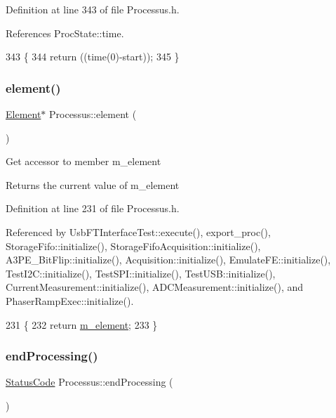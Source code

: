Definition at line 343 of file Processus.\+h.



References Proc\+State\+::time.


\begin{DoxyCode}
343                                    \{
344     \textcolor{keywordflow}{return} ((time(0)-start));
345   \}
\end{DoxyCode}
\mbox{\label{classProcessus_a6fe155527431a7190b7d44d600b9608d}} 
\subsubsection{\texorpdfstring{element()}{element()}}
{\footnotesize\ttfamily \hyperlink{classElement}{Element}$\ast$ Processus\+::element (\begin{DoxyParamCaption}{ }\end{DoxyParamCaption})\hspace{0.3cm}{\ttfamily [inline]}}

Get accessor to member m\+\_\+element \begin{DoxyReturn}{Returns}
the current value of m\+\_\+element 
\end{DoxyReturn}


Definition at line 231 of file Processus.\+h.



Referenced by Usb\+F\+T\+Interface\+Test\+::execute(), export\+\_\+proc(), Storage\+Fifo\+::initialize(), Storage\+Fifo\+Acquisition\+::initialize(), A3\+P\+E\+\_\+\+Bit\+Flip\+::initialize(), Acquisition\+::initialize(), Emulate\+F\+E\+::initialize(), Test\+I2\+C\+::initialize(), Test\+S\+P\+I\+::initialize(), Test\+U\+S\+B\+::initialize(), Current\+Measurement\+::initialize(), A\+D\+C\+Measurement\+::initialize(), and Phaser\+Ramp\+Exec\+::initialize().


\begin{DoxyCode}
231                       \{
232     \textcolor{keywordflow}{return} \hyperlink{classProcessus_aa9d24d53c3e52f36786cabb5d8e296e7}{m\_element};
233   \}
\end{DoxyCode}
\mbox{\label{classProcessus_a5e4da662989d356b89d490b89c7afbfd}} 
\subsubsection{\texorpdfstring{end\+Processing()}{endProcessing()}}
{\footnotesize\ttfamily \hyperlink{classStatusCode}{Status\+Code} Processus\+::end\+Processing (\begin{DoxyParamCaption}{ }\end{DoxyParamCaption})}

